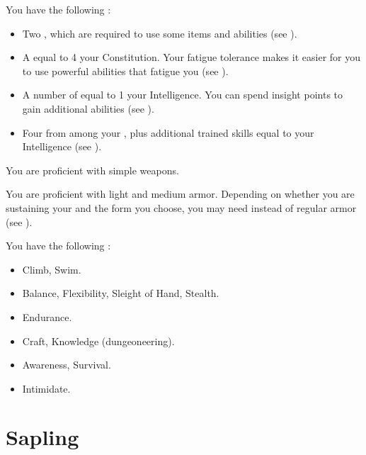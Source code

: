          You have the following :
        \begin{itemize}
            \item Two , which are required to use some items and abilities (see ).
            \item A  equal to 4 \add your Constitution.
                Your fatigue tolerance makes it easier for you to use powerful abilities that fatigue you (see ).
            \item A number of  equal to 1 \add your Intelligence.
                You can spend insight points to gain additional abilities (see ).
            \item Four  from among your , plus additional trained skills equal to your Intelligence (see ).
        \end{itemize}

        You are proficient with simple weapons.

        You are proficient with light and medium armor.
        Depending on whether you are sustaining your  and the form you choose, you may need  instead of regular armor (see ).

        You have the following :
        \begin{itemize}
            \item {} Climb, Swim.
            \item {} Balance, Flexibility, Sleight of Hand, Stealth.
            \item {} Endurance.
            \item {} Craft, Knowledge (dungeoneering).
            \item {} Awareness, Survival.
            \item {} Intimidate.
        \end{itemize}

\section{Sapling}

